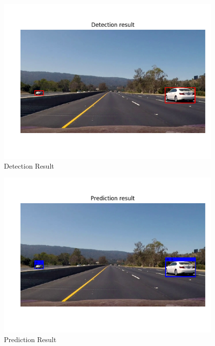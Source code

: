 \documentclass[10pt,twocolumn,letterpaper]{article}
\begin{document}
\begin{figure}[!h]
\begin{center}
   \includegraphics[width=1\linewidth]{__1.png}
\end{center}
   \caption{Detection Result}
\label{fig:4_1}
\end{figure}

\begin{figure}[!h]
\begin{center}
   \includegraphics[width=1\linewidth]{__2.png}
\end{center}
   \caption{Prediction Result}
\label{fig:4_2}
\end{figure}
\end{document}
